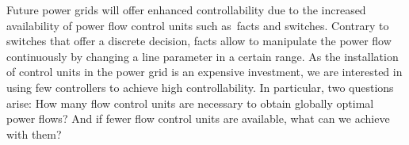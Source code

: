 % 
\label{ch:facts}
\glsresetall
% 
Future power grids will offer enhanced controllability due to the increased
availability of power flow control units such as~\gls{facts} and switches.
Contrary to switches that offer a discrete decision, \gls{facts} allow to
manipulate the power flow continuously by changing a line parameter in a certain
range. As the installation of control units in the power grid is an expensive
investment, we are interested in using few controllers to achieve high
controllability. In particular, two questions arise: How many flow control units
are necessary to obtain globally optimal power flows? And if fewer flow control
units are available, what can we achieve with them?

